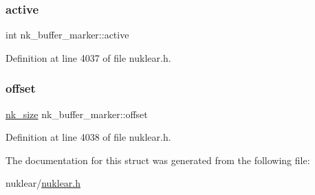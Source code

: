 \subsubsection{\texorpdfstring{active}{active}}
{\footnotesize\ttfamily int nk\+\_\+buffer\+\_\+marker\+::active}



Definition at line 4037 of file nuklear.\+h.

\mbox{\label{structnk__buffer__marker_a225c3628eb1e93f2400496110c4bd87a}} 
\subsubsection{\texorpdfstring{offset}{offset}}
{\footnotesize\ttfamily \mbox{\hyperlink{nuklear_8h_a84c0fc50dec5501be327b33d41d9010c}{nk\+\_\+size}} nk\+\_\+buffer\+\_\+marker\+::offset}



Definition at line 4038 of file nuklear.\+h.



The documentation for this struct was generated from the following file\+:\begin{DoxyCompactItemize}
\item 
nuklear/\mbox{\hyperlink{nuklear_8h}{nuklear.\+h}}\end{DoxyCompactItemize}
